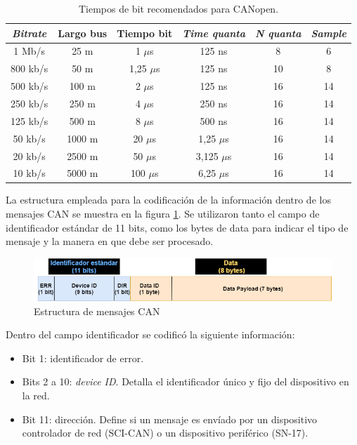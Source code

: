 \newpage

\begin{table}[h!]
	\centering
	\caption[Tiempos de bit recomendados para CANopen.]{Tiempos de bit recomendados para CANopen.}
	\begin{tabular}{c c c c c c}    
		\toprule
		\textbf{\textit{Bitrate}} & \textbf{Largo bus} & \textbf{Tiempo bit} & \textbf{\textit{Time quanta}} & \textbf{\textit{N quanta}} & \textbf{\textit{Sample}} \\
		\midrule
		1 Mb/s 		& 25 m 	& 1 $\mu$s		& 125 ns & 8 	& 6 \\
		800 kb/s 	& 50 m 	& 1,25 $\mu$s	& 125 ns & 10 	& 8 \\
		500 kb/s 	& 100 m & 2 $\mu$s		& 125 ns & 16 	& 14 \\
		250 kb/s 	& 250 m & 4 $\mu$s		& 250 ns & 16 	& 14 \\
		125 kb/s 	& 500 m & 8 $\mu$s		& 500 ns & 16 	& 14 \\
		50 kb/s 	& 1000 m & 20 $\mu$s	& 1,25 $\mu$s & 16 	& 14 \\
		20 kb/s 	& 2500 m & 50 $\mu$s	& 3,125 $\mu$s & 16 	& 14 \\
		10 kb/s 	& 5000 m & 100 $\mu$s	& 6,25 $\mu$s & 16 	& 14 \\
		\bottomrule
		\hline
	\end{tabular}
	\label{tab:bit_times}
\end{table}

La estructura empleada para la codificación de la información dentro de los mensajes CAN se muestra en la figura \ref{fig:estructura_mensajes}. Se utilizaron tanto el campo de identificador estándar de 11 bits, como los bytes de data para indicar el tipo de mensaje y la manera en que debe ser procesado.

\begin{figure}[h!]
	\centering
	\includegraphics[width=1\linewidth ,height=0.12\textheight]{./Figures/estructura_mensaje.png}
	\caption{Estructura de mensajes CAN}
	\label{fig:estructura_mensajes}
\end{figure}

Dentro del campo identificador se codificó la siguiente información:
\begin{itemize}
	\item Bit 1: identificador de error.
	\item Bits 2 a 10: \textit{device ID}. Detalla el identificador único y fijo del dispositivo en la red.
	\item Bit 11: dirección. Define si un mensaje es envíado por un dispositivo controlador de red (SCI-CAN) o un dispositivo periférico (SN-17).
\end{itemize}

